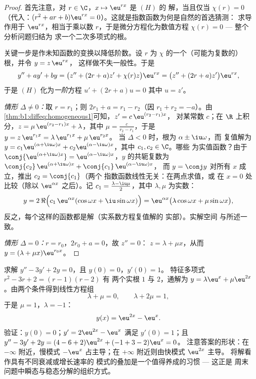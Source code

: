 \begin{proof}
首先注意，对 $r \in \C$，$x \mapsto \eu^{rx}$ 是 $(H)$ 的
解，当且仅当 $\chi(r) = 0$（代入：$(r^2 + ar + b)\eu^{rx} =
0$）。这就是指数函数为何是自然的首选猜测：
求导作用于 $\eu^{rx}$，相当于乘以数
$r$，于是微分方程化为数值方程
$\chi(r) = 0$ --- 整个分析问题归结为
求一个二次多项式的根。

关键一步是作未知函数的变换以降低阶数。设 $r$
为 $\chi$ 的一个（可能为复数的）根，并令 $y = z\, \eu^{rx}$，
这样做不失一般性。于是
\[
y'' + ay' + by
= \bigl(z'' + (2r + a) z' + \chi(r) z\bigr)\eu^{rx}
= \bigl(z'' + (2r + a) z'\bigr)\eu^{rx},
\]
于是 $(H)$ 化为\emph{一阶}方程 $u' + (2r + a) u = 0$
其中 $u = z'$。

\emph{情形 $\Delta \neq 0$：}取 $r = r_1$；则 $2r_1 + a = r_1 -
r_2$（因 $r_1 + r_2 = -a$）。由
\cref{thm:b1:diffeq:homogeneous1}可知，$z' = c\,\eu^{(r_2 - r_1)x}$，
对某常数 $c$；在 $\R$ 上积分，$z = \mu\, \eu^{(r_2 - r_1)x}
+ \lambda$，其中 $\mu = \frac{c}{r_2 - r_1}$，于是 $y = z\,
\eu^{r_1 x} = \lambda\,\eu^{r_1x} + \mu\,\eu^{r_2x}$。
当 $\Delta < 0$ 时，根为 $\alpha \pm \iu\omega$，而
复值解为 $y = c_1\eu^{(\alpha+\iu\omega)x} +
c_2\eu^{(\alpha-\iu\omega)x}$，其中 $c_1, c_2 \in \C$。哪些
为实值函数？由于 $\conj{\eu^{(\alpha+\iu\omega)x}} =
\eu^{(\alpha-\iu\omega)x}$，$y$ 的共轭复数为 $\conj{c_2}\,
\eu^{(\alpha+\iu\omega)x} + \conj{c_1}\,\eu^{(\alpha-\iu\omega)x}$，
而 $y = \conj y$ 对所有 $x$ 成立，推出 $c_2 = \conj{c_1}$（两个
指数函数线性无关：在两点求值，或
在 $x=0$ 处比较（除以 $\eu^{\alpha x}$ 之后）。记 $c_1
= \frac{\lambda - \iu\mu}2$，其中 $\lambda, \mu$ 为实数：
\[
y = 2\,\Re\Bigl(c_1\,\eu^{\alpha x}(\cos\omega x +
\iu\sin\omega x)\Bigr)
= \eu^{\alpha x}\bigl(\lambda\cos\omega x + \mu\sin\omega
x\bigr),
\]
反之，每个这样的函数都是解（实系数方程复值解的
实部）。实解空间
与所述一致。

\emph{情形 $\Delta = 0$：}$r = r_0$，$2r_0 + a = 0$，故 $z'' = 0$：
$z = \lambda + \mu x$，从而 $y = (\lambda + \mu x)\eu^{r_0 x}$。
\end{proof}

\begin{example}\label{ex:b1:diffeq:cauchy2}
求解 $y'' - 3y' + 2y = 0$，且 $y(0) = 0$，$y'(0) = 1$。
特征多项式 $r^2 - 3r + 2 = (r - 1)(r - 2)$ 有
两个实根 $1$ 与 $2$，通解为 $y = \lambda\eu^{x} +
\mu\eu^{2x}$。由两个条件得到线性方程组
\[
\lambda + \mu = 0, \qquad \lambda + 2\mu = 1 ,
\]
于是 $\mu = 1$，$\lambda = -1$：
\[
y(x) = \eu^{2x} - \eu^{x} .
\]
验证：$y(0) = 0$；$y' = 2\eu^{2x} - \eu^x$ 满足 $y'(0) = 1$；且
$y'' - 3y' + 2y = (4 - 6 + 2)\eu^{2x} + (-1 + 3 - 2)\eu^x = 0$。
注意答案的形状：在 $-\infty$ 附近，慢模式
$-\eu^x$ 占主导；在 $+\infty$ 附近则由快模式 $\eu^{2x}$ 主导。
将解看作具有不同衰减或增长速率的
模式的叠加是一个值得养成的习惯 --- 这正是
周末问题中瞬态与稳态分解的组织方式。
\end{example}

